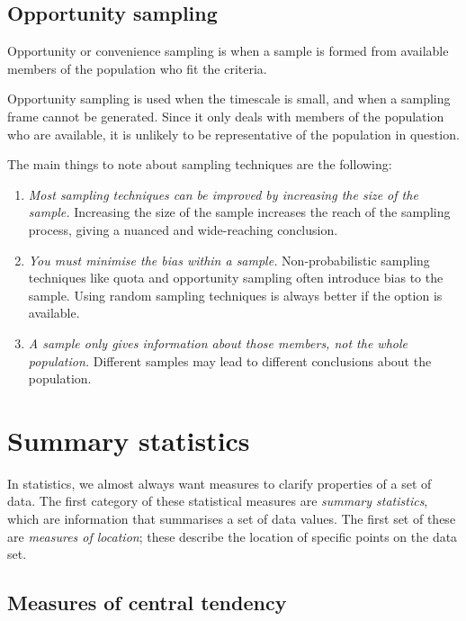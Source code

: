 \subsection{Opportunity sampling}

\begin{tcolorbox}
    \begin{definition}
        Opportunity or convenience sampling is when a sample is formed from available members of the population who fit the criteria.
    \end{definition}
\end{tcolorbox}

Opportunity sampling is used when the timescale is small, and when a sampling frame cannot be generated. Since it only deals with members of the population who are available, it is unlikely to be representative of the population in question.

The main things to note about sampling techniques are the following:
\begin{enumerate}
    \item \textit{Most sampling techniques can be improved by increasing the size of the sample.} Increasing the size of the sample increases the reach of the sampling process, giving a nuanced and wide-reaching conclusion.
    \item \textit{You must minimise the bias within a sample.} Non-probabilistic sampling techniques like quota and opportunity sampling often introduce bias to the sample. Using random sampling techniques is always better if the option is available.
    \item \textit{A sample only gives information about those members, not the whole population.} Different samples may lead to different conclusions about the population.
\end{enumerate}

\section{Summary statistics}

In statistics, we almost always want measures to clarify properties of a set of data. The first category of these statistical measures are \textit{summary statistics}, which are information that summarises a set of data values. The first set of these are \textit{measures of location}; these describe the location of specific points on the data set. 

\subsection{Measures of central tendency}

